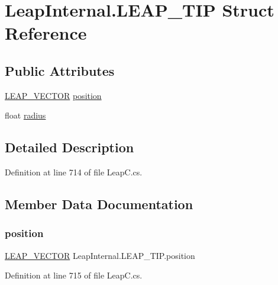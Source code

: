 \hypertarget{struct_leap_internal_1_1_l_e_a_p___t_i_p}{}\section{Leap\+Internal.\+L\+E\+A\+P\+\_\+\+T\+IP Struct Reference}
\label{struct_leap_internal_1_1_l_e_a_p___t_i_p}
\subsection*{Public Attributes}
\begin{DoxyCompactItemize}
\item 
\mbox{\hyperlink{struct_leap_internal_1_1_l_e_a_p___v_e_c_t_o_r}{L\+E\+A\+P\+\_\+\+V\+E\+C\+T\+OR}} \mbox{\hyperlink{struct_leap_internal_1_1_l_e_a_p___t_i_p_a12f20534852348a20036859a25200f02}{position}}
\item 
float \mbox{\hyperlink{struct_leap_internal_1_1_l_e_a_p___t_i_p_a38d148332dc4e11a12ed241427612c92}{radius}}
\end{DoxyCompactItemize}


\subsection{Detailed Description}


Definition at line 714 of file Leap\+C.\+cs.



\subsection{Member Data Documentation}
\mbox{\label{struct_leap_internal_1_1_l_e_a_p___t_i_p_a12f20534852348a20036859a25200f02}} 
\subsubsection{\texorpdfstring{position}{position}}
{\footnotesize\ttfamily \mbox{\hyperlink{struct_leap_internal_1_1_l_e_a_p___v_e_c_t_o_r}{L\+E\+A\+P\+\_\+\+V\+E\+C\+T\+OR}} Leap\+Internal.\+L\+E\+A\+P\+\_\+\+T\+I\+P.\+position}



Definition at line 715 of file Leap\+C.\+cs.

